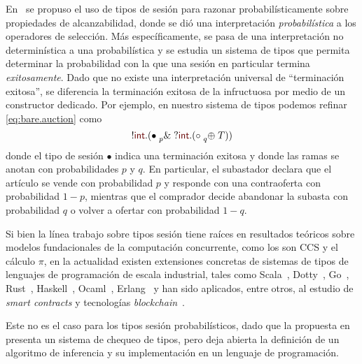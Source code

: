 \documentclass{article}
\newcommand{\mktype}[1]{\mathsf{\color{myred}#1}}
\newcommand{\tint}{\mktype{int}}
\newcommand{\parens}[1]{(#1)}
\newcommand{\tdone}{{\bullet}}
\newcommand{\tend}{{\circ}}
\newcommand{\cin}[2][.]{{?}#2#1}
\newcommand{\cout}[2][.]{{!}#2#1}
\newcommand{\xpoint}[3]{#1 \mathrel{#2} #3}
\newcommand{\tbranch}[3][p]{\xpoint{#2}{\prescript{}{#1}{\&}}{#3}}
\newcommand{\tchoice}[3][p]{\xpoint{#2}{\prescript{}{#1}{\oplus}}{#3}}
\newcommand{\T}{T}
\begin{document}
En~\cite{DBLP:conf/concur/InversoMPTT20} se propuso el uso de tipos de sesi\'on para
razonar probabil\'isticamente sobre propiedades de alcanzabilidad, donde se di\'o
 una interpretaci\'on
\emph{probabil\'istica} a los operadores de selecci\'on. M\'as específicamente, se pasa 
 de una interpretación no determin\'istica a una probabilística y se 
 estudia un sistema de tipos que permita determinar la probabilidad con la que una sesi\'on en particular
termina \emph{exitosamente}. Dado que no existe una interpretaci\'on universal
 de ``terminación exitosa'', se diferencia la terminaci\'on exitosa de la 
 infructuosa  por medio de un
  {constructor dedicado}.
%
Por ejemplo, en nuestro sistema de tipos podemos refinar
\eqref{eq:bare.auction} como
\begin{equation}
  \label{eq:refined.auction}
  \cout\tint\parens{
    \tbranch[p]\tdone{
      \cin\tint\parens{
        \tchoice[q]\tend\T
      }
    }
  }
\end{equation}
donde el tipo de sesión $\tdone$ indica una terminación exitosa y donde las
ramas  se anotan con probabilidades $p$ y
$q$. En particular, el subastador declara que el artículo se vende con
probabilidad $p$ y  responde con una contraoferta con probabilidad
$1-p$, mientras que el comprador decide abandonar la subasta con
probabilidad $q$ o volver a ofertar  con probabilidad $1-q$.

Si bien la l\'inea trabajo sobre tipos sesi\'on tiene ra\'ices en resultados te\'oricos
sobre modelos fundacionales de la computaci\'on concurrente, como
los son CCS y el c\'alculo $\pi$, en la actualidad existen extensiones
concretas de sistemas de tipos de lenguajes de programaci\'on de
escala industrial, tales como Scala~\cite{DBLP:conf/pldi/ScalasYB19}, Dotty~\cite{DBLP:conf/pldi/ScalasYB19}, Go~\cite{DBLP:conf/icse/LangeNTY18,DBLP:conf/icse/LangeNTY18}, Rust~\cite{DBLP:journals/corr/abs-1909-05970,DBLP:conf/coordination/LagaillardieNY20}, Haskell~\cite{orchard2017session,DBLP:conf/haskell/LindleyM16}, 
Ocaml~\cite{DBLP:journals/jfp/Padovani17,DBLP:conf/coordination/LagaillardieNY20,DBLP:conf/ecoop/ImaiNYY19}, Erlang~\cite{fowler2016erlang} y han sido aplicados, entre otros, 
al estudio de  {\em smart contracts} y tecnolog\'ias {\em blockchain}~\cite{10.1145/3417516,DBLP:journals/corr/abs-1902-06056}. 

Este no es el caso para los tipos sesi\'on probabil\'isticos, dado que
 la propuesta en~\cite{DBLP:conf/concur/InversoMPTT20} presenta un sistema de chequeo 
de tipos, pero deja abierta la definici\'on de un algoritmo de inferencia y su implementaci\'on 
en un lenguaje de programaci\'on.
\end{document}

